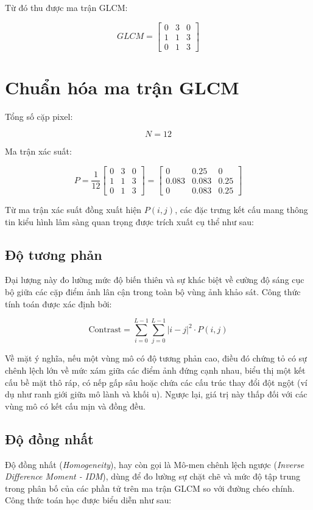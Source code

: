 Từ đó thu được ma trận GLCM:

\[
GLCM=
\begin{bmatrix}
0 & 3 & 0\\
1 & 1 & 3\\
0 & 1 & 3
\end{bmatrix}
\]

\section*{Chuẩn hóa ma trận GLCM}

Tổng số cặp pixel:

\[
N = 12
\]

Ma trận xác suất:

\[
P
=
\frac{1}{12}
\begin{bmatrix}
0 & 3 & 0\\
1 & 1 & 3\\
0 & 1 & 3
\end{bmatrix}
=
\begin{bmatrix}
0 & 0.25 & 0\\
0.083 & 0.083 & 0.25\\
0 & 0.083 & 0.25
\end{bmatrix}
\]



Từ ma trận xác suất đồng xuất hiện $P(i, j)$, các đặc trưng kết cấu mang thông tin kiểu hình lâm sàng quan trọng được trích xuất cụ thể như sau:

\subsection{Độ tương phản}
Đại lượng này đo lường mức độ biến thiên và sự khác biệt về cường độ sáng cục bộ giữa các cặp điểm ảnh lân cận trong toàn bộ vùng ảnh khảo sát. Công thức tính toán được xác định bởi:

\begin{equation}
\text{Contrast} = \sum_{i=0}^{L-1} \sum_{j=0}^{L-1} |i - j|^2 \cdot P(i, j)
\label{eq:contrast}
\end{equation}

Về mặt ý nghĩa, nếu một vùng mô có độ tương phản cao, điều đó chứng tỏ có sự chênh lệch lớn về mức xám giữa các điểm ảnh đứng cạnh nhau, biểu thị một kết cấu bề mặt thô ráp, có nếp gấp sâu hoặc chứa các cấu trúc thay đổi đột ngột (ví dụ như ranh giới giữa mô lành và khối u). Ngược lại, giá trị này thấp đối với các vùng mô có kết cấu mịn và đồng đều.

\subsection{Độ đồng nhất}
Độ đồng nhất (\textit{Homogeneity}), hay còn gọi là Mô-men chênh lệch ngược (\textit{Inverse Difference Moment - IDM}), dùng để đo lường sự chặt chẽ và mức độ tập trung trong phân bố của các phần tử trên ma trận GLCM so với đường chéo chính. Công thức toán học được biểu diễn như sau:

